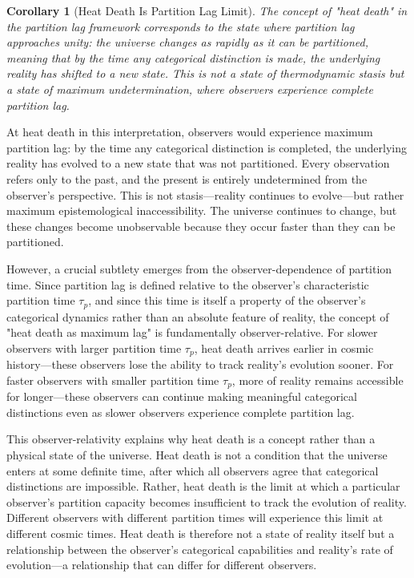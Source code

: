 \documentclass[12pt,a4paper]{article}
\newtheorem{corollary}[theorem]{Corollary}
\theoremstyle{definition}
\theoremstyle{remark}
\begin{document}
\begin{corollary}[Heat Death Is Partition Lag Limit]
\label{cor:heat_death_partition}
The concept of "heat death" in the partition lag framework corresponds to the state where partition lag approaches unity: the universe changes as rapidly as it can be partitioned, meaning that by the time any categorical distinction is made, the underlying reality has shifted to a new state. This is not a state of thermodynamic stasis but a state of maximum undetermination, where observers experience complete partition lag.
\end{corollary}

At heat death in this interpretation, observers would experience maximum partition lag: by the time any categorical distinction is completed, the underlying reality has evolved to a new state that was not partitioned. Every observation refers only to the past, and the present is entirely undetermined from the observer's perspective. This is not stasis—reality continues to evolve—but rather maximum epistemological inaccessibility. The universe continues to change, but these changes become unobservable because they occur faster than they can be partitioned.

However, a crucial subtlety emerges from the observer-dependence of partition time. Since partition lag is defined relative to the observer's characteristic partition time $\tau_p$, and since this time is itself a property of the observer's categorical dynamics rather than an absolute feature of reality, the concept of "heat death as maximum lag" is fundamentally observer-relative. For slower observers with larger partition time $\tau_p$, heat death arrives earlier in cosmic history—these observers lose the ability to track reality's evolution sooner. For faster observers with smaller partition time $\tau_p$, more of reality remains accessible for longer—these observers can continue making meaningful categorical distinctions even as slower observers experience complete partition lag.

This observer-relativity explains why heat death is a concept rather than a physical state of the universe. Heat death is not a condition that the universe enters at some definite time, after which all observers agree that categorical distinctions are impossible. Rather, heat death is the limit at which a particular observer's partition capacity becomes insufficient to track the evolution of reality. Different observers with different partition times will experience this limit at different cosmic times. Heat death is therefore not a state of reality itself but a relationship between the observer's categorical capabilities and reality's rate of evolution—a relationship that can differ for different observers.
\end{document}
